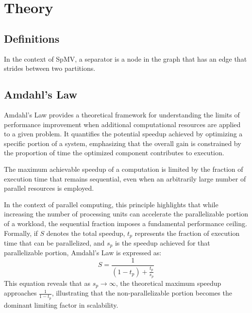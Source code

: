 
\chapter{Theory}

\section{Definitions}

\begin{definition}[Separator]
    In the context of SpMV, a separator is a node in the graph that has an edge that strides between two partitions.
\end{definition}

\section{Amdahl's Law}

Amdahl’s Law provides a theoretical framework for understanding the limits of performance improvement when additional computational resources are applied to a given problem. It quantifies the potential speedup achieved by optimizing a specific portion of a system, emphasizing that the overall gain is constrained by the proportion of time the optimized component contributes to execution.

\begin{definition} The maximum achievable speedup of a computation is limited by the fraction of execution time that remains sequential, even when an arbitrarily large number of parallel resources is employed. \end{definition}

In the context of parallel computing, this principle highlights that while increasing the number of processing units can accelerate the parallelizable portion of a workload, the sequential fraction imposes a fundamental performance ceiling. Formally, if \(S\)  denotes the total speedup, \(t_{p}\) represents the fraction of execution time that can be parallelized, and \(s_{p}\) is the speedup achieved for that parallelizable portion, Amdahl’s Law is expressed as:
\begin{equation} S = \frac{1}{(1 - t_p) + \frac{t_p}{s_p}} \end{equation}
This equation reveals that as \(s_{p} \rightarrow \infty\), the theoretical maximum speedup approaches \(\frac{1}{1-t_{p}}\), illustrating that the non-parallelizable portion becomes the dominant limiting factor in scalability.




